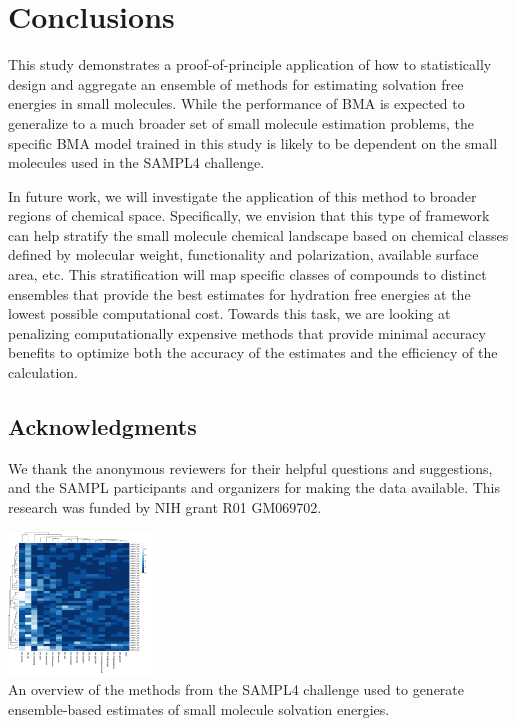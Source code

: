 \documentclass[journal=jpcbfk, manuscript=article]{achemso}
\newcommand{\+}[1]{\ensuremath{\mathbf{#1}}}
\newcommand{\rev}[1]{#1}
\begin{document}
\section{Conclusions}
This study demonstrates a proof-of-principle application of how to statistically design and aggregate an ensemble of methods for estimating solvation free energies in small molecules.
While the performance of BMA is expected to generalize to a much broader set of small molecule estimation problems, the specific BMA model trained in this study is likely to be dependent on the small molecules used in the SAMPL4 challenge.

\rev{In future work, we will investigate the application of this method to broader regions of chemical space.
Specifically, we envision that this type of framework can help stratify the small molecule chemical landscape based on chemical classes defined by molecular weight, functionality and polarization, available surface area, etc.
This stratification will map specific classes of compounds to distinct ensembles that provide the best estimates for hydration free energies at the lowest possible computational cost.
Towards this task, we are looking at penalizing computationally expensive methods that provide minimal accuracy benefits to optimize both the accuracy of the estimates and the efficiency of the calculation.}

\subsection*{Acknowledgments}
\rev{We thank the anonymous reviewers for their helpful questions and suggestions, and the SAMPL participants and organizers for making the data available.} 
This research was funded by NIH grant R01 GM069702.



\begin{tocentry}
	\centering
	\includegraphics[height=1.5in,keepaspectratio]{Figures/Single_Stage_Molecule_RMSE/Molecule_RMSE_Stage_01} 
	\mbox{} \\
	An overview of the methods from the SAMPL4 challenge used to generate ensemble-based estimates of small molecule solvation energies.
\end{tocentry}
\end{document}
